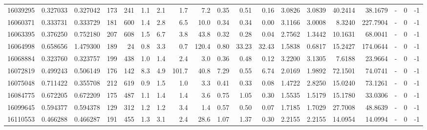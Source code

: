 \begin{tabular}{rrrrrrrrrrrrrrrrlrr}
  16039295 & 0.327033 &   0.327042 &  173 &  241 &      1.1 &      2.1 &     1.7 &      7.2 &       0.35 &        0.51 &        0.16 &  3.0826 &  3.0839 &   40.2414 &   38.1679 &             - &        0 &         -1 \\
  16060371 & 0.333731 &   0.333729 &  181 &  600 &      1.4 &      2.8 &     6.5 &     10.0 &       0.34 &        0.34 &        0.00 &  3.1166 &  3.0008 &    8.3240 &  227.7904 &             - &        0 &         -1 \\
  16063395 & 0.376250 &   0.752180 &  207 &  608 &      1.5 &      6.7 &     3.8 &     43.8 &       0.32 &        0.28 &        0.04 &  2.7562 &  1.3442 &   10.1631 &   68.0041 &             - &        0 &         -1 \\
  16064998 & 0.658656 &   1.479300 &  189 &   24 &      0.8 &      3.3 &     0.7 &    120.4 &       0.80 &       33.23 &       32.43 &  1.5838 &  0.6817 &   15.2427 &  174.0644 &             - &        0 &         -1 \\
  16068884 & 0.323760 &   0.323757 &  199 &  438 &      1.0 &      1.4 &     2.4 &      3.0 &       0.36 &        0.48 &        0.12 &  3.2200 &  3.1305 &    7.6188 &   23.9664 &             - &        0 &         -1 \\
  16072819 & 0.499243 &   0.506149 &  176 &  142 &      8.3 &      4.9 &   101.7 &     40.8 &       7.29 &        0.55 &        6.74 &  2.0169 &  1.9892 &   72.1501 &   74.0741 &             - &        0 &         -1 \\
  16075048 & 0.711422 &   0.355708 &  212 &  619 &      0.9 &      1.5 &     1.0 &      3.3 &       0.41 &        0.33 &        0.08 &  1.4722 &  2.8250 &   15.0240 &   73.1261 &             - &        0 &         -1 \\
  16084775 & 0.672205 &   0.672209 &  175 &  487 &      1.1 &      1.4 &     1.4 &      3.6 &       0.75 &        1.05 &        0.30 &  1.5535 &  1.5179 &   15.1780 &   33.0306 &             - &        0 &         -1 \\
  16099645 & 0.594377 &   0.594378 &  129 &  312 &      1.2 &      1.2 &     3.4 &      1.4 &       0.57 &        0.50 &        0.07 &  1.7185 &  1.7029 &   27.7008 &   48.8639 &             - &        0 &         -1 \\
  16110553 & 0.466288 &   0.466287 &  191 &  455 &      1.3 &      3.1 &     2.4 &     28.6 &       1.07 &        1.37 &        0.30 &  2.2155 &  2.2155 &   14.0954 &   14.0994 &             - &        0 &         -1 \\

\end{tabular}
